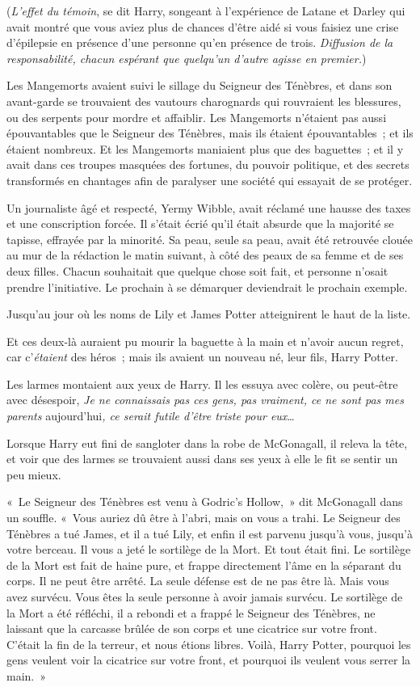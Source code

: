 (\emph{L'effet du témoin}, se dit Harry, songeant à l'expérience de Latane et Darley qui avait montré que vous aviez plus de chances d'être aidé si vous faisiez une crise d'épilepsie en présence d'une personne qu'en présence de trois. \emph{Diffusion de la responsabilité, chacun espérant que quelqu'un d'autre agisse en premier.})

Les Mangemorts avaient suivi le sillage du Seigneur des Ténèbres, et dans son avant-garde se trouvaient des vautours charognards qui rouvraient les blessures, ou des serpents pour mordre et affaiblir. Les Mangemorts n'étaient pas aussi épouvantables que le Seigneur des Ténèbres, mais ils étaient épouvantables~; et ils étaient nombreux. Et les Mangemorts maniaient plus que des baguettes~; et il y avait dans ces troupes masquées des fortunes, du pouvoir politique, et des secrets transformés en chantages afin de paralyser une société qui essayait de se protéger.

Un journaliste âgé et respecté, Yermy Wibble, avait réclamé une hausse des taxes et une conscription forcée. Il s'était écrié qu'il était absurde que la majorité se tapisse, effrayée par la minorité. Sa peau, seule sa peau, avait été retrouvée clouée au mur de la rédaction le matin suivant, à côté des peaux de sa femme et de ses deux filles. Chacun souhaitait que quelque chose soit fait, et personne n'osait prendre l'initiative. Le prochain à se démarquer deviendrait le prochain exemple.

Jusqu'au jour où les noms de Lily et James Potter atteignirent le haut de la liste.

Et ces deux-là auraient pu mourir la baguette à la main et n'avoir aucun regret, car c'\emph{étaient} des héros~; mais ils avaient un nouveau né, leur fils, Harry Potter.

Les larmes montaient aux yeux de Harry. Il les essuya avec colère, ou peut-être avec désespoir, \emph{Je ne connaissais pas ces gens, pas vraiment, ce ne sont pas mes parents} aujourd'hui\emph{, ce serait futile d'être triste pour eux}…

Lorsque Harry eut fini de sangloter dans la robe de McGonagall, il releva la tête, et voir que des larmes se trouvaient aussi dans ses yeux à elle le fit se sentir un peu mieux.

«~Le Seigneur des Ténèbres est venu à Godric's Hollow,~» dit McGonagall dans un souffle. «~Vous auriez dû être à l'abri, mais on vous a trahi. Le Seigneur des Ténèbres a tué James, et il a tué Lily, et enfin il est parvenu jusqu'à vous, jusqu'à votre berceau. Il vous a jeté le sortilège de la Mort. Et tout était fini. Le sortilège de la Mort est fait de haine pure, et frappe directement l'âme en la séparant du corps. Il ne peut être arrêté. La seule défense est de ne pas être là. Mais vous avez survécu. Vous êtes la seule personne à avoir jamais survécu. Le sortilège de la Mort a été réfléchi, il a rebondi et a frappé le Seigneur des Ténèbres, ne laissant que la carcasse brûlée de son corps et une cicatrice sur votre front. C'était la fin de la terreur, et nous étions libres. Voilà, Harry Potter, pourquoi les gens veulent voir la cicatrice sur votre front, et pourquoi ils veulent vous serrer la main.~»

